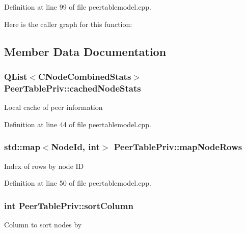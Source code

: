 Definition at line 99 of file peertablemodel.\+cpp.



Here is the caller graph for this function\+:




\subsection{Member Data Documentation}
\hypertarget{class_peer_table_priv_a8da9d0256d11f205dfa1cdce86843761}{}
\subsubsection[{cached\+Node\+Stats}]{\setlength{\rightskip}{0pt plus 5cm}Q\+List$<${\bf C\+Node\+Combined\+Stats}$>$ Peer\+Table\+Priv\+::cached\+Node\+Stats}\label{class_peer_table_priv_a8da9d0256d11f205dfa1cdce86843761}
Local cache of peer information 

Definition at line 44 of file peertablemodel.\+cpp.

\hypertarget{class_peer_table_priv_ae27db14bcbe769f494c4db56ef27fb08}{}
\subsubsection[{map\+Node\+Rows}]{\setlength{\rightskip}{0pt plus 5cm}std\+::map$<${\bf Node\+Id}, int$>$ Peer\+Table\+Priv\+::map\+Node\+Rows}\label{class_peer_table_priv_ae27db14bcbe769f494c4db56ef27fb08}
Index of rows by node I\+D 

Definition at line 50 of file peertablemodel.\+cpp.

\hypertarget{class_peer_table_priv_a4917597853d2d5f0055be017b8ab33c5}{}
\subsubsection[{sort\+Column}]{\setlength{\rightskip}{0pt plus 5cm}int Peer\+Table\+Priv\+::sort\+Column}\label{class_peer_table_priv_a4917597853d2d5f0055be017b8ab33c5}
Column to sort nodes by 

